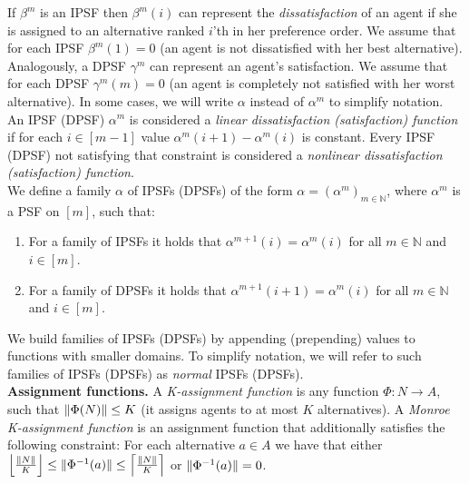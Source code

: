 If $\beta^{m}$ is an IPSF then $\beta^{m}(i)$ can represent the \textit{dissatisfaction} of an agent if she is assigned to an alternative ranked $i$'th in her preference order. We assume that for each IPSF $\beta^{m}(1) = 0$ (an agent is not dissatisfied with her best alternative). Analogously, a DPSF $\gamma^{m}$ can represent an agent's satisfaction. We assume that for each DPSF $\gamma^{m}(m) = 0$ (an agent is completely not satisfied with her worst alternative). In some cases, we will write $\alpha$ instead of $\alpha^{m}$ to simplify notation.
\\

An IPSF (DPSF) $\alpha^{m}$ is considered a \textit{linear dissatisfaction (satisfaction) function} if for each $i \in [m-1]$ value $\alpha^{m}(i+1) - \alpha^{m}(i)$ is constant. Every IPSF (DPSF) not satisfying that constraint is considered a \textit{nonlinear dissatisfaction (satisfaction) function}.
\\

We define a family $\alpha$ of IPSFs (DPSFs) of the form $\alpha = (\alpha^{m})_{m \in \mathbb{N}}$, where $\alpha^{m}$ is a PSF on $[m]$, such that:

\begin{enumerate}
	\item For a family of IPSFs it holds that $\alpha^{m+1}(i) = \alpha^{m}(i)$ for all $m \in \mathbb{N}$ and $i \in [m]$.
	\item For a family of DPSFs it holds that $\alpha^{m+1}(i+1) = \alpha^{m}(i)$ for all $m \in \mathbb{N}$ and $i \in [m]$.
\end{enumerate}

We build families of IPSFs (DPSFs) by appending (prepending) values to functions with smaller domains. To simplify notation, we will refer to such families of IPSFs (DPSFs) as \textit{normal} IPSFs (DPSFs).
\\

\noindent
\textbf{Assignment functions.} \hspace{.1in} A \textit{K-assignment function} is any function $\Phi: N \rightarrow A$, such that $\lVert\Phi(N)\rVert \leq K$ (it assigns agents to at most $K$ alternatives). A \textit{Monroe K-assignment function} is an assignment function that additionally satisfies the following constraint: For each alternative $a \in A$ we have that either $\left\lfloor \frac{\lVert N\rVert}{K} \right\rfloor \leq \lVert\Phi^{-1}(a)\rVert \leq \left\lceil \frac{\lVert N\rVert}{K} \right\rceil$ or $\lVert\Phi^{-1}(a)\rVert = 0$.
\\

